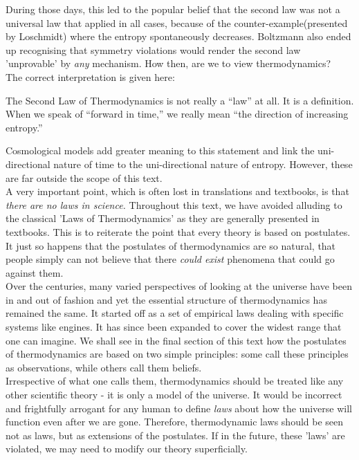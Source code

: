 \documentclass[oneside]{book}
\begin{document}
During those days, this led to the popular belief that the second law was not a universal law that applied in all cases, because of the counter-example(presented by Loschmidt) where the entropy spontaneously decreases. Boltzmann also ended up recognising that symmetry violations would render the second law 'unprovable' by \emph{any} mechanism. How then, are we to view thermodynamics?\\

The correct interpretation is given here:

\begin{mdframed}[style=exercise]
The Second Law of Thermodynamics is not really a “law” at all. It is a definition. When we speak of “forward in time,” we really mean “the direction of increasing entropy.” 
\end{mdframed}

Cosmological models add greater meaning to this statement and link the uni-directional nature of time to the uni-directional nature of entropy. However, these are far outside the scope of this text.\\

A very important point, which is often lost in translations and textbooks, is that \emph{there are no laws in science.} Throughout this text, we have avoided alluding to the classical 'Laws of Thermodynamics' as they are generally presented in textbooks. This is to reiterate the point that every theory is based on postulates. It just so happens that the postulates of thermodynamics are so natural, that people simply can not believe that there \emph{could exist} phenomena that could go against them.\\

Over the centuries, many varied perspectives of looking at the universe have been in and out of fashion and yet the essential structure of thermodynamics has remained the same. It started off as a set of empirical laws dealing with specific systems like engines. It has since been expanded to cover the widest range that one can imagine. We shall see in the final section of this text how the postulates of thermodynamics are based on two simple principles: some call these principles as observations, while others call them beliefs.\\
 
Irrespective of what one calls them, thermodynamics should be treated like any other scientific theory - it is only a model of the universe. It would be incorrect and frightfully arrogant for any human to define \emph{laws} about how the universe will function even after we are gone. Therefore, thermodynamic laws should be seen not as laws, but as extensions of the postulates. If in the future, these 'laws' are violated, we may need to modify our theory superficially.\\
\end{document}
